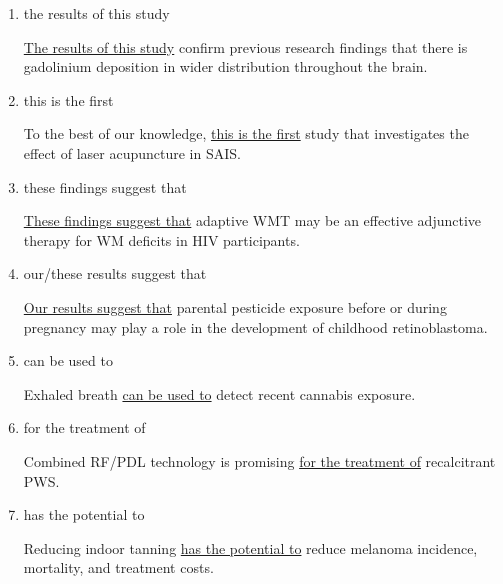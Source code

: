 \documentclass[a4paper]{ctexbook}
\begin{document}
    \begin{enumerate}
      \item the results of this study
      \begin{eg}{}
        \uline{The results of this study} confirm previous research findings that there is gadolinium deposition in wider distribution throughout the brain.
      \end{eg}

      \item this is the first
      \begin{eg}{}
        To the best of our knowledge, \uline{this is the first} study that investigates the effect of laser acupuncture in SAIS.  
      \end{eg}

      \item these findings suggest that
      \begin{eg}{}
        \uline{These findings suggest that} adaptive WMT may be an effective adjunctive therapy for WM deficits in HIV participants.  
      \end{eg}

      \item our/these results suggest that
      \begin{eg}{}
        \uline{Our results suggest that} parental pesticide exposure before or during pregnancy may play a role in the development of childhood retinoblastoma. 
      \end{eg}

      \item can be used to
      \begin{eg}{}
        Exhaled breath \uline{can be used to} detect recent cannabis exposure.
      \end{eg}

      \item for the treatment of
      \begin{eg}{}
        Combined RF/PDL technology is promising \uline{for the treatment of} recalcitrant PWS. 
      \end{eg}

      \item has the potential to
      \begin{eg}{}
        Reducing indoor tanning \uline{has the potential to} reduce melanoma incidence, mortality, and treatment costs. 
      \end{eg}

    \end{enumerate}
\end{document}

